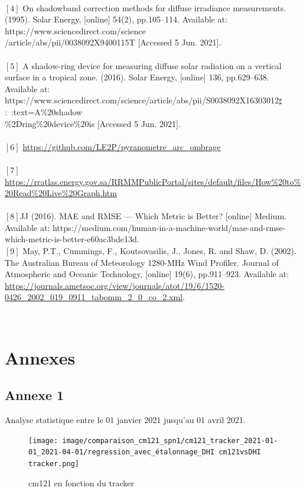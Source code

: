 \documentclass[12pt,a4paper]{article}
\begin{document}
\begin{flushleft}
‌~\\
$[4]$ On shadowband correction methods for diffuse irradiance measurements. (1995). Solar Energy, [online] 54(2), pp.105–114. Available at: https://www.sciencedirect.com/science\\/article/abs/pii/0038092X9400115T [Accessed 5 Jun. 2021].\\

‌~\\
$[5]$ A shadow-ring device for measuring diffuse solar radiation on a vertical surface in a tropical zone. (2016). Solar Energy, [online] 136, pp.629–638. Available at: https://www.sciencedirect.com/science/article/abs/pii/S0038092X16303012$\sharp$:~:text=A\%20shadow\\\%2Dring\%20device\%20is [Accessed 5 Jun. 2021].\\
‌~\\
$[6]$ \url{https://github.com/LE2P/pyranometre\_arc\_ombrage} \\
~\\
$[7]$ \url{https://rratlas.energy.gov.sa/RRMMPublicPortal/sites/default/files/How\%20to\%20Read\%20Live\%20Graph.htm} \\
~\\
$[8]$JJ (2016). MAE and RMSE — Which Metric is Better? [online] Medium. Available at: https://medium.com/human-in-a-machine-world/mae-and-rmse-which-metric-is-better-e60ac3bde13d.
~\\
$[9]$ May, P.T., Cummings, F., Koutsovasilis, J., Jones, R. and Shaw, D. (2002). The Australian Bureau of Meteorology 1280-MHz Wind Profiler. Journal of Atmospheric and Oceanic Technology, [online] 19(6), pp.911–923. Available at: \url{https://journals.ametsoc.org/view/journals/atot/19/6/1520-0426_2002_019_0911_tabomm_2_0_co_2.xml}.

\newpage

‌\section{Annexes}
\subsection{Annexe 1}
Analyse statistique entre le 01 janvier 2021 jusqu'au 01 avril 2021.

\begin{figure}[H]
\centering
\texttt{[image: image/comparaison\_cm121\_spn1/cm121\_tracker\_2021-01-01\_2021-04-01/regression\_avec\_étalonnage\_DHI cm121vsDHI tracker.png]} 
\caption{cm121 en fonction du tracker}    
\end{figure}


\end{flushleft}
\end{document}
